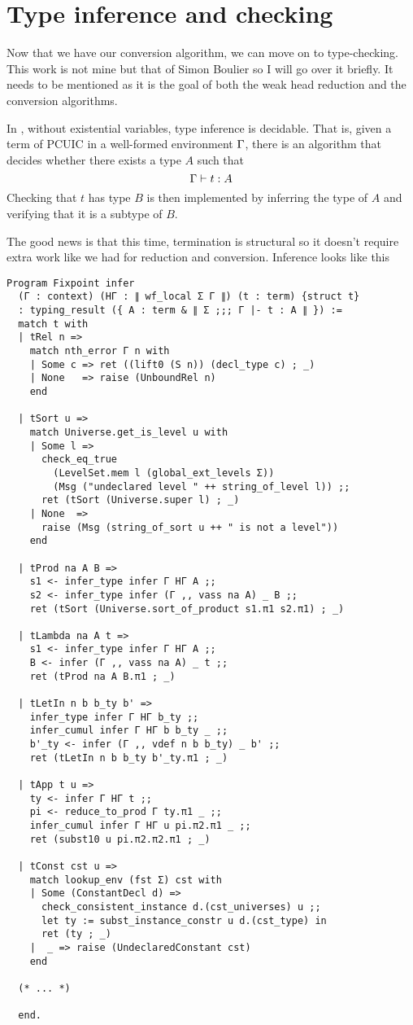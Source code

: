 \chapter{Type inference and checking}

Now that we have our conversion algorithm, we can move on to type-checking.
This work is not mine but that of Simon Boulier so I will go over it briefly.
It needs to be mentioned as it is the goal of both the weak head reduction
and the conversion algorithms.

In \Coq, without existential variables, type inference is decidable. That is,
given a term of \acrshort{PCUIC} in a well-formed environment \(\Gamma\), there is
an algorithm that decides whether there exists a type \(A\) such that
\[
  \Gamma \vdash t : A
\]
%
Checking that \(t\) has type \(B\) is then implemented by inferring the type of
\(A\) and verifying that it is a subtype of \(B\).

The good news is that this time, termination is structural so it doesn't require
extra work like we had for reduction and conversion.
Inference looks like this
\begin{verbatim}
Program Fixpoint infer
  (Γ : context) (HΓ : ∥ wf_local Σ Γ ∥) (t : term) {struct t}
  : typing_result ({ A : term & ∥ Σ ;;; Γ |- t : A ∥ }) :=
  match t with
  | tRel n =>
    match nth_error Γ n with
    | Some c => ret ((lift0 (S n)) (decl_type c) ; _)
    | None   => raise (UnboundRel n)
    end

  | tSort u =>
    match Universe.get_is_level u with
    | Some l =>
      check_eq_true
        (LevelSet.mem l (global_ext_levels Σ))
        (Msg ("undeclared level " ++ string_of_level l)) ;;
      ret (tSort (Universe.super l) ; _)
    | None  =>
      raise (Msg (string_of_sort u ++ " is not a level"))
    end

  | tProd na A B =>
    s1 <- infer_type infer Γ HΓ A ;;
    s2 <- infer_type infer (Γ ,, vass na A) _ B ;;
    ret (tSort (Universe.sort_of_product s1.π1 s2.π1) ; _)

  | tLambda na A t =>
    s1 <- infer_type infer Γ HΓ A ;;
    B <- infer (Γ ,, vass na A) _ t ;;
    ret (tProd na A B.π1 ; _)

  | tLetIn n b b_ty b' =>
    infer_type infer Γ HΓ b_ty ;;
    infer_cumul infer Γ HΓ b b_ty _ ;;
    b'_ty <- infer (Γ ,, vdef n b b_ty) _ b' ;;
    ret (tLetIn n b b_ty b'_ty.π1 ; _)

  | tApp t u =>
    ty <- infer Γ HΓ t ;;
    pi <- reduce_to_prod Γ ty.π1 _ ;;
    infer_cumul infer Γ HΓ u pi.π2.π1 _ ;;
    ret (subst10 u pi.π2.π2.π1 ; _)

  | tConst cst u =>
    match lookup_env (fst Σ) cst with
    | Some (ConstantDecl d) =>
      check_consistent_instance d.(cst_universes) u ;;
      let ty := subst_instance_constr u d.(cst_type) in
      ret (ty ; _)
    |  _ => raise (UndeclaredConstant cst)
    end

  (* ... *)

  end.
\end{verbatim}

